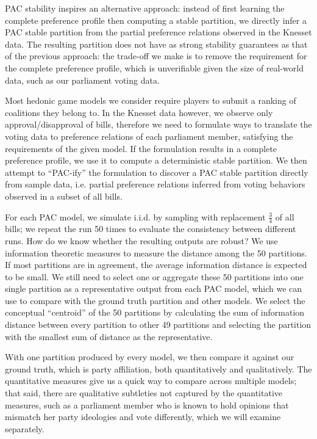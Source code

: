 PAC stability inspires an alternative approach: instead of first learning the complete preference profile then computing a stable partition, we directly
infer a PAC stable partition from the partial preference relations observed in the Knesset data.
The resulting partition does not have as strong stability guarantees as that
of the previous approach: the trade-off we make is to remove the requirement for
the complete preference profile, which is unverifiable given the size of
real-world data, such as our parliament voting data.

Most hedonic game models we consider require players to submit a ranking of
coalitions they belong to.
In the Knesset data however, we observe only approval/disapproval of bills,
therefore we need to formulate ways to translate the voting data to preference
relations of each parliament member, satisfying the requirements of the given
model.
If the formulation results in a complete preference profile, we use it to
compute a deterministic stable partition.
We then attempt to ``PAC-ify'' the formulation to discover a PAC stable partition
directly from sample data, i.e. partial preference relations inferred from
voting behaviors observed in a subset of all bills.

For each PAC model, we simulate i.i.d. by sampling with replacement
$\frac{3}{4}$ of all bills; we repeat the run 50 times to evaluate the
consistency between different runs.
How do we know whether the resulting outputs are robust?
We use information theoretic measures to measure the distance among the 50
partitions.
If most partitions are in agreement, the average information distance is
expected to be small.
We still need to select one or aggregate these 50 partitions into one single
partition as a representative output from each PAC model, which we can use
to compare with the ground truth partition and other models.
We select the conceptual ``centroid'' of the 50 partitions by calculating
the sum of information distance between every partition to other 49 partitions
and selecting the partition with the smallest sum of distance as the
representative.

With one partition produced by every model, we then compare it against our
ground truth, which is party affiliation, both quantitatively and qualitatively.
The quantitative measures give us a quick way to compare across multiple models;
that said, there are qualitative subtleties not captured by the quantitative
measures, such as a parliament member who is known to hold opinions that
mismatch her party ideologies and vote differently, which we will examine
separately.

